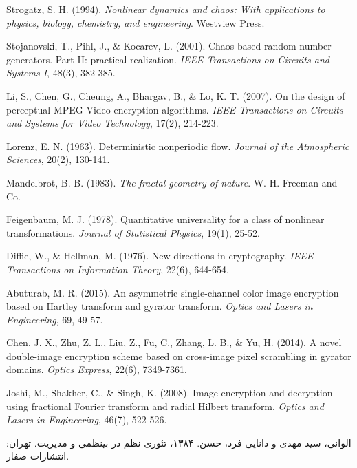  Strogatz, S. H. (1994). \textit{Nonlinear dynamics and chaos: With applications to physics, biology, chemistry, and engineering}. Westview Press.



 Stojanovski, T., Pihl, J., \& Kocarev, L. (2001). Chaos-based random number generators. Part II: practical realization. \textit{IEEE Transactions on Circuits and Systems I}, 48(3), 382-385.



 Li, S., Chen, G., Cheung, A., Bhargav, B., \& Lo, K. T. (2007). On the design of perceptual MPEG Video encryption algorithms. \textit{IEEE Transactions on Circuits and Systems for Video Technology}, 17(2), 214-223.



 Lorenz, E. N. (1963). Deterministic nonperiodic flow. \textit{Journal of the Atmospheric Sciences}, 20(2), 130-141.



 Mandelbrot, B. B. (1983). \textit{The fractal geometry of nature}. W. H. Freeman and Co.



 Feigenbaum, M. J. (1978). Quantitative universality for a class of nonlinear transformations. \textit{Journal of Statistical Physics}, 19(1), 25-52.



 Diffie, W., \& Hellman, M. (1976). New directions in cryptography. \textit{IEEE Transactions on Information Theory}, 22(6), 644-654.



 Abuturab, M. R. (2015). An asymmetric single-channel color image encryption based on Hartley transform and gyrator transform. \textit{Optics and Lasers in Engineering}, 69, 49-57.



 Chen, J. X., Zhu, Z. L., Liu, Z., Fu, C., Zhang, L. B., \& Yu, H. (2014). A novel double-image encryption scheme based on cross-image pixel scrambling in gyrator domains. \textit{Optics Express}, 22(6), 7349-7361.



 Joshi, M., Shakher, C., \& Singh, K. (2008). Image encryption and decryption using fractional Fourier transform and radial Hilbert transform. \textit{Optics and Lasers in Engineering}, 46(7), 522-526.


 الوانی، سید مهدی و دانایی فرد، حسن. ۱۳۸۴، تئوری نظم در بینظمی و مدیریت. تهران: انتشارات صفار.


